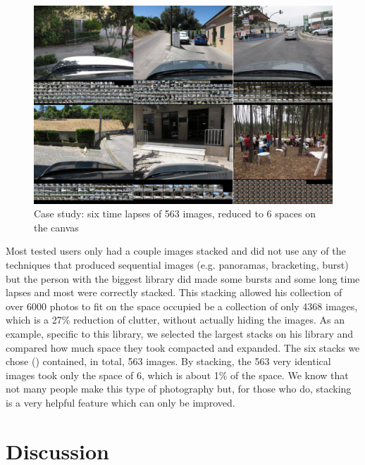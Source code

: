 \begin{figure}
	\vspace{-20pt}
	\begin{center}
		\includegraphics[width=\linewidth]{Figures/filcab-time-lapse-563-imgs-to-6.png}
	\end{center}
	\vspace{-20pt}
	\caption{Case study: six time lapses of 563 images, reduced to 6 spaces on the canvas}
	\vspace{-5pt}
	\label{fig:filcab:stacks}
\end{figure}

Most tested users only had a couple images stacked and did not use any of the techniques that produced sequential images (e.g. panoramas, bracketing, burst) but the person with the biggest library did made some bursts and some long time lapses and most were correctly stacked. This stacking allowed his collection of over 6000 photos to fit on the space occupied be a collection of only 4368 images, which is a 27\% reduction of clutter, without actually hiding the images. As an example, specific to this library, we selected the largest stacks on his library and compared how much space they took compacted and expanded. The six stacks we chose () contained, in total, 563 images. By stacking, the 563 very identical images took only the space of 6, which is about 1\% of the space. We know that not many people make this type of photography but, for those who do, stacking is a very helpful feature which can only be improved.



\section{Discussion}


